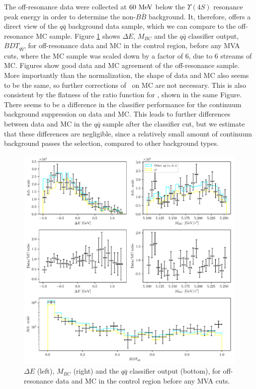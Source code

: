 The off-resonance data were collected at $60\mathrm{~MeV}$ below the $\Upsilon(4S)$ resonance peak energy in order to determine the non-$B\bar B$ background. It, therefore, offers a direct view of the $q\bar q$ background data sample, which we can compare to the off-resonance MC sample. Figure \ref{fig:offres_control} shows $\Delta E$, $M_{BC}$ and the $q \bar q$ classifier output, $BDT_{q\bar q}$, for off-resonance data and MC in the control region, before any MVA cuts, where the MC sample was scaled down by a factor of $6$, due to 6 streams of MC. Figures show good data and MC agreement of the off-resonance sample. More importantly than the normalization, the shape of data and MC also seems to be the same, so further corrections of \vars~on MC are not necessary. This is also consistent by the flatness of the ratio function for \vars, shown in the same Figure. There seems to be a difference in the classifier performance for the continuum background suppression on data and MC. This leads to further differences between data and MC in the $q \bar q$ sample after the classifier cut, but we estimate that these differences are negligible, since a relatively small amount of continuum background passes the selection, compared to other background types.
\begin{figure}[H]
	\centering
	\captionsetup{width=0.8\linewidth}
	\includegraphics[width=\linewidth]{fig/offres_control}
	\caption{$\Delta E$ (left), $M_{BC}$ (right) and the $q \bar q$ classifier output (bottom), for off-resonance data and MC in the control region before any MVA cuts.}
	\label{fig:offres_control}
\end{figure}

